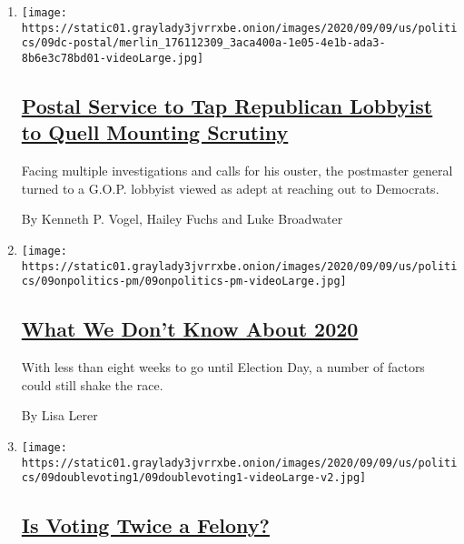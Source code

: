 \begin{enumerate}
\def\labelenumi{\arabic{enumi}.}
\item
  \texttt{[image: https://static01.graylady3jvrrxbe.onion/images/2020/09/09/us/politics/09dc-postal/merlin\_176112309\_3aca400a-1e05-4e1b-ada3-8b6e3c78bd01-videoLarge.jpg]}

  \hypertarget{postal-service-to-tap-republican-lobbyist-to-quell-mounting-scrutiny}{%
  \subsection{\texorpdfstring{\href{/2020/09/09/us/postal-service-lobbyist.html}{Postal
  Service to Tap Republican Lobbyist to Quell Mounting
  Scrutiny}}{Postal Service to Tap Republican Lobbyist to Quell Mounting Scrutiny}}\label{postal-service-to-tap-republican-lobbyist-to-quell-mounting-scrutiny}}

  Facing multiple investigations and calls for his ouster, the
  postmaster general turned to a G.O.P. lobbyist viewed as adept at
  reaching out to Democrats.

  By Kenneth P. Vogel, Hailey Fuchs and Luke Broadwater
\item
  \texttt{[image: https://static01.graylady3jvrrxbe.onion/images/2020/09/09/us/politics/09onpolitics-pm/09onpolitics-pm-videoLarge.jpg]}

  \hypertarget{what-we-dont-know-about-2020}{%
  \subsection{\texorpdfstring{\href{/2020/09/09/us/politics/what-we-dont-know-about-2020.html}{What
  We Don't Know About
  2020}}{What We Don't Know About 2020}}\label{what-we-dont-know-about-2020}}

  With less than eight weeks to go until Election Day, a number of
  factors could still shake the race.

  By Lisa Lerer
\item
  \texttt{[image: https://static01.graylady3jvrrxbe.onion/images/2020/09/09/us/politics/09doublevoting1/09doublevoting1-videoLarge-v2.jpg]}

  \hypertarget{is-voting-twice-a-felony}{%
  \subsection{\texorpdfstring{\href{/article/voting-twice.html}{Is
  Voting Twice a
  Felony?}}{Is Voting Twice a Felony?}}\label{is-voting-twice-a-felony}}


\end{enumerate}
